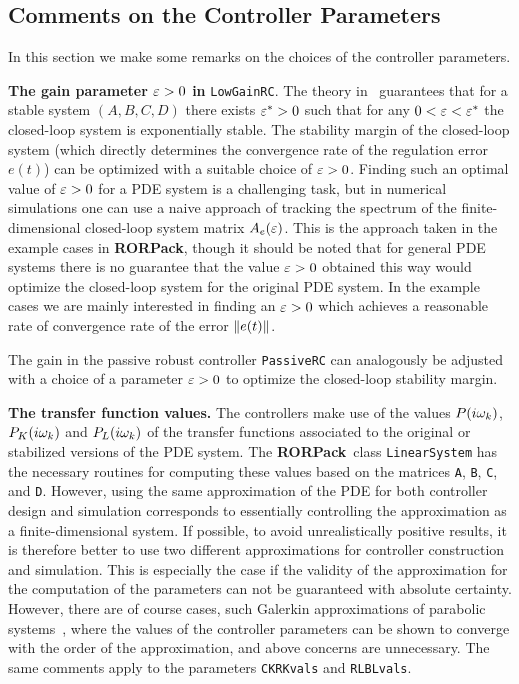 \documentclass[11pt, a4paper]{amsart}
\theoremstyle{definition}
\numberwithin{equation}{section}
\newcommand{\RORname}{\textbf{RORPack}}
\begin{document}
\subsection{Comments on the Controller Parameters}

In this section we make some remarks on the choices of the controller parameters.

\textbf{The gain parameter $\varepsilon>0$ in }\texttt{LowGainRC}. 
The theory in~\cite{HamPoh00,RebWei03} guarantees that for a stable system $(A,B,C,D)$ there exists $\varepsilon^\ast>0$ such that for any $0<\varepsilon<\varepsilon^\ast$ the closed-loop system is exponentially stable. The stability margin of the closed-loop system (which directly determines the convergence rate of the regulation error $e(t)$) can be optimized with a suitable choice of $\varepsilon>0$. Finding such an optimal value of $\varepsilon>0$ for a PDE system is a challenging task, but in numerical simulations one can use a naive approach of tracking the spectrum of the finite-dimensional closed-loop system matrix $A_e(\varepsilon)$. This is the approach taken in the example cases in \RORname, though it should be noted that for general PDE systems there is no guarantee that the value $\varepsilon>0$ obtained this way would optimize the closed-loop system for the original PDE system. 
In the example cases we are mainly interested in finding an $\varepsilon>0$ which achieves a reasonable rate of convergence rate of the error $\lVert e(t)\rVert$.

The gain in the passive robust controller \texttt{PassiveRC} can analogously be adjusted with a choice of a parameter $\varepsilon>0$ to optimize the closed-loop stability margin.

\textbf{The transfer function values.} The controllers make use of the values $P(i\omega_k)$, $P_K(i\omega_k)$ and $P_L(i\omega_k)$ of the transfer functions associated to the original or stabilized versions of the PDE system.
The \RORname\ class \texttt{LinearSystem} has the necessary routines for computing these values based on the matrices \texttt{A}, \texttt{B}, \texttt{C}, and \texttt{D}. However, using the same approximation of the PDE for both controller design and simulation corresponds to essentially controlling the approximation as a finite-dimensional system. If possible, to avoid unrealistically positive results, it is therefore better to use two different approximations for controller construction and simulation. This is especially the case if the validity of the approximation for the computation of the parameters can not be guaranteed with absolute certainty. However, there are of course cases, such Galerkin approximations of parabolic systems~\cite{Mor94}, where the values of the controller parameters can be shown to converge with the order of the approximation, and above concerns are unnecessary.
The same comments apply to the parameters \texttt{CKRKvals} and \texttt{RLBLvals}.
\end{document}
